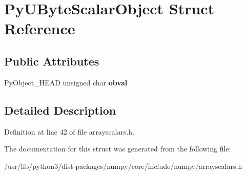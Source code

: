 \hypertarget{structPyUByteScalarObject}{}\section{Py\+U\+Byte\+Scalar\+Object Struct Reference}
\label{structPyUByteScalarObject}
\subsection*{Public Attributes}
\begin{DoxyCompactItemize}
\item 
Py\+Object\+\_\+\+H\+E\+AD unsigned char {\bfseries obval}\hypertarget{structPyUByteScalarObject_a2229fc75dac09ac91c657c6929cb04a1}{}\label{structPyUByteScalarObject_a2229fc75dac09ac91c657c6929cb04a1}

\end{DoxyCompactItemize}


\subsection{Detailed Description}


Definition at line 42 of file arrayscalars.\+h.



The documentation for this struct was generated from the following file\+:\begin{DoxyCompactItemize}
\item 
/usr/lib/python3/dist-\/packages/numpy/core/include/numpy/arrayscalars.\+h\end{DoxyCompactItemize}
